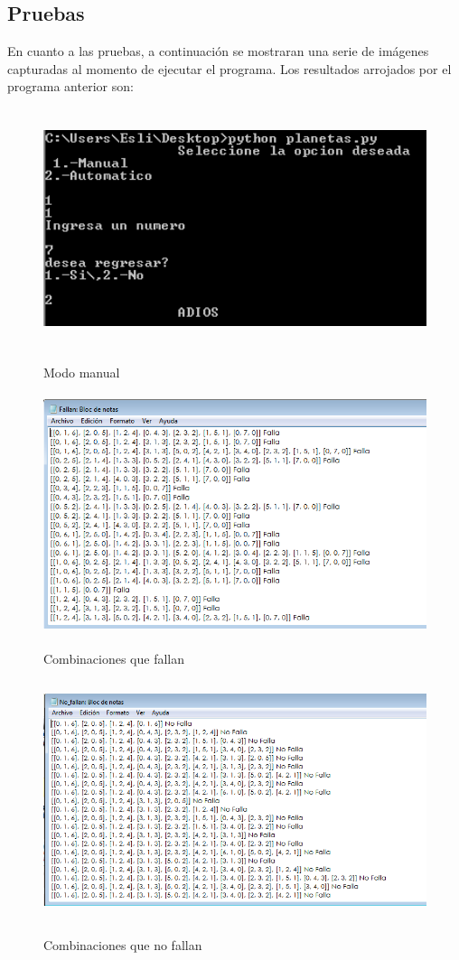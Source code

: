 \documentclass[12pt]{article}
\begin{document}
\subsection{Pruebas}
En cuanto a las pruebas, a continuación se mostraran una serie de imágenes capturadas al momento de ejecutar el programa. Los resultados arrojados por el programa anterior son:

\begin{figure}[H]
\includegraphics[width=\textwidth, height=7cm]{manual_planetas}
\label{fig:manual_afn}
\caption{Modo manual}
\end{figure}

\begin{figure}[H]
\includegraphics[width=\textwidth, height=7cm]{manual_planetas_salida}
\label{fig:manual_afn}
\caption{Combinaciones que fallan}
\end{figure}
\begin{figure}[H]
\includegraphics[width=\textwidth, height=7cm]{manual_planetas_salida2}
\label{fig:manual_afn}
\caption{Combinaciones que no fallan}
\end{figure}
\end{document}
